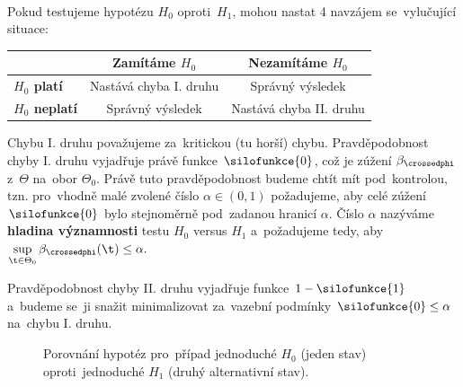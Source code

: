 ~\\
Pokud testujeme hypotézu $H_0$ oproti~$H_1$, mohou nastat 4 navzájem se~vylučující situace:\begin{center}
	\begin{tabular}{|l|c|c|}
		\hline 
		& \textbf{Zamítáme $H_0$} & \textbf{Nezamítáme $H_0$} \\ 
		\hline 
		\textbf{$H_0$ platí} & Nastává chyba I. druhu  & Správný výsledek \\ 
		\hline 
		\textbf{$H_0$ neplatí} & Správný výsledek & Nastává chyba II. druhu\\ 
		\hline 
	\end{tabular} 
\end{center}
Chybu I. druhu považujeme za~kritickou (tu horší) chybu. Pravděpodobnost chyby I. druhu vyjadřuje právě funkce $\silofunkce{0}$, což je zúžení $\beta_\crossedphi$ z~$\Theta$ na~obor $\Theta_0$. Právě tuto pravděpodobnost budeme chtít mít pod~kontrolou, tzn. pro~vhodně malé zvolené číslo $\alpha\in(0,1)$ požadujeme, aby celé zúžení $\silofunkce{0}$ bylo stejnoměrně pod~zadanou hranicí $\alpha$. 
Číslo $\alpha$ nazýváme \textbf{hladina významnosti} testu $H_0$ versus $H_1$ a~požadujeme tedy, aby $\sup\limits_{\t\in\Theta_0}\beta_\crossedphi(\t)\leq \alpha.$


Pravděpodobnost chyby II. druhu vyjadřuje funkce $1-\silofunkce{1}$ a~budeme se~ji snažit minimalizovat za~vazební podmínky $\silofunkce{0}\leq \alpha$ na~chybu I. druhu.

\begin{figure}[h]
	\centering
	\caption{Porovnání hypotéz pro~případ jednoduché $H_0$ (jeden stav) oproti~jednoduché $H_1$ (druhý alternativní stav).}
	\label{fig:grafik}
\end{figure}

